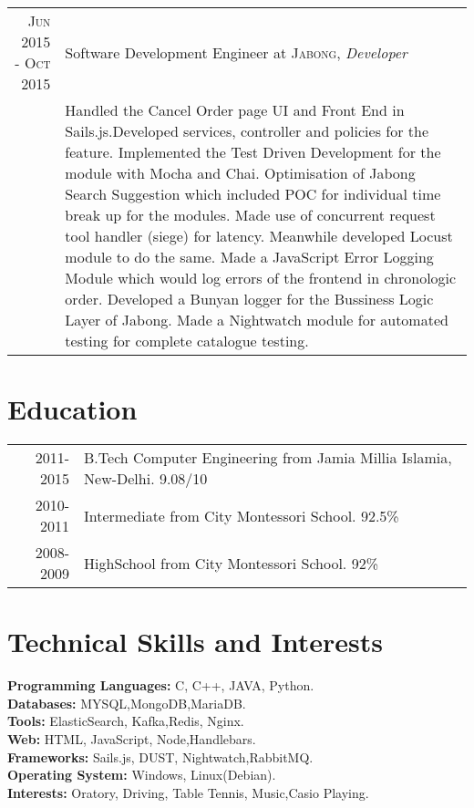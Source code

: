 \documentclass[a4paper,10pt]{article}
\begin{document}
\begin{tabular}{r|p{11cm}}
\textsc{Jun 2015 - Oct 2015} & Software Development Engineer at \textsc{Jabong}, \newline \emph{Developer}\\&\footnotesize{Handled the Cancel Order page UI and Front End in Sails.js.Developed services, controller and policies for the feature.\newline
Implemented the Test Driven Development for the module with Mocha and Chai.\newline
Optimisation of Jabong Search Suggestion which included POC for individual time break up for the modules. Made use of
concurrent request tool handler (siege) for latency. Meanwhile developed Locust module to do the same.\newline
Made a JavaScript Error Logging Module which would log errors of the frontend in chronologic order.\newline
Developed a Bunyan logger for the Bussiness Logic Layer of Jabong.\newline
Made a Nightwatch module for automated testing for complete catalogue testing.\newline}
\end{tabular}
\section{Education}
\begin{tabular}{rl}
 \textsc{2011-2015} & B.Tech Computer Engineering  from Jamia Millia Islamia, New-Delhi. 9.08/10 \normalsize\\
\textsc{2010-2011} &Intermediate from City Montessori School.  92.5\% \normalsize\\
\textsc{2008-2009} & HighSchool from City Montessori School.  92\% \normalsize\\
\end{tabular}


\section{Technical Skills and Interests}
\textbf{Programming Languages:} C, C++, JAVA, Python. \\
\textbf{Databases:} MYSQL,MongoDB,MariaDB.\\
\textbf{Tools:} ElasticSearch, Kafka,Redis, Nginx. \\
\textbf{Web:} HTML, JavaScript, Node,Handlebars.\\
\textbf{Frameworks:} Sails.js, DUST, Nightwatch,RabbitMQ.\\
\textbf{Operating System:} Windows, Linux(Debian).\\
\textbf{Interests:} Oratory, Driving, Table Tennis, Music,Casio Playing.\\
\end{document}
